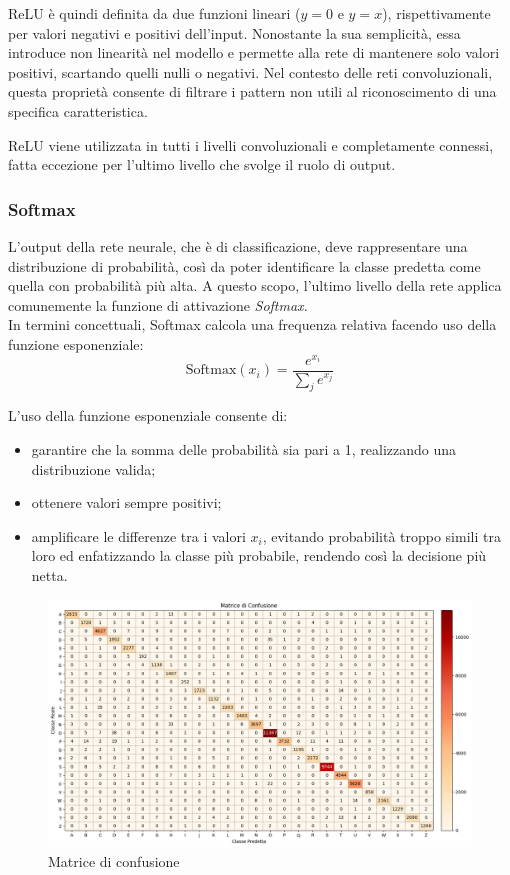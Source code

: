 \documentclass[a4paper,12pt]{article}
\begin{document}
ReLU è quindi definita da due funzioni lineari ($y=0$ e $y=x$), rispettivamente per valori negativi e positivi dell'input. Nonostante la sua semplicità, essa introduce non linearità nel modello e permette alla rete di mantenere solo valori positivi, scartando quelli nulli o negativi.  
Nel contesto delle reti convoluzionali, questa proprietà consente di filtrare i pattern non utili al riconoscimento di una specifica caratteristica.  

ReLU viene utilizzata in tutti i livelli convoluzionali e completamente connessi, fatta eccezione per l'ultimo livello che svolge il ruolo di output.

\subsubsection{Softmax}
L'output della rete neurale, che è di classificazione, deve rappresentare una distribuzione di probabilità, così da poter identificare la classe predetta come quella con probabilità più alta. A questo scopo, l'ultimo livello della rete applica comunemente la funzione di attivazione \textit{Softmax}.\\
In termini concettuali, Softmax calcola una frequenza relativa facendo uso della funzione esponenziale:
$$
    \text{Softmax}(x_i) = \frac{\displaystyle e^{\displaystyle x_i}}{\displaystyle \sum_j e^{\displaystyle x_j}}
$$

L'uso della funzione esponenziale consente di:
\begin{itemize}
    \item garantire che la somma delle probabilità sia pari a 1, realizzando una distribuzione valida;
    \item ottenere valori sempre positivi;
    \item amplificare le differenze tra i valori $x_i$, evitando probabilità troppo simili tra loro ed enfatizzando la classe più probabile, rendendo così la decisione più netta.
\end{itemize}

\begin{figure}[H]
    \centering
    \includegraphics[width=1\linewidth]{images/confusion_matrix.png}
    \caption{Matrice di confusione}
    \label{confusion_matrix}
\end{figure}
\end{document}
